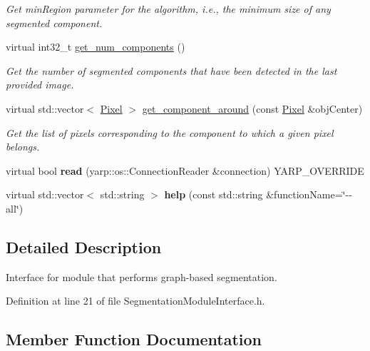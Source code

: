\begin{DoxyCompactItemize}
\begin{DoxyCompactList}\small\item\em Get min\+Region parameter for the algorithm, i.\+e., the minimum size of any segmented component. \end{DoxyCompactList}\item 
virtual int32\+\_\+t \hyperlink{classyarp_1_1sig_1_1SegmentationModuleInterface_a3c6b695fbef9e6827e7dd6b4cbbc38fe}{get\+\_\+num\+\_\+components} ()
\begin{DoxyCompactList}\small\item\em Get the number of segmented components that have been detected in the last provided image. \end{DoxyCompactList}\item 
virtual std\+::vector$<$ \hyperlink{classyarp_1_1sig_1_1Pixel}{Pixel} $>$ \hyperlink{classyarp_1_1sig_1_1SegmentationModuleInterface_a9bf0b95fbab216b2284122b0b8a36820}{get\+\_\+component\+\_\+around} (const \hyperlink{classyarp_1_1sig_1_1Pixel}{Pixel} \&obj\+Center)
\begin{DoxyCompactList}\small\item\em Get the list of pixels corresponding to the component to which a given pixel belongs. \end{DoxyCompactList}\item 
\mbox{\label{classyarp_1_1sig_1_1SegmentationModuleInterface_a8ed15458e768ad8dcc58b622a6f1d282}} 
virtual bool {\bfseries read} (yarp\+::os\+::\+Connection\+Reader \&connection) Y\+A\+R\+P\+\_\+\+O\+V\+E\+R\+R\+I\+DE
\item 
\mbox{\label{classyarp_1_1sig_1_1SegmentationModuleInterface_a14ea1dff9efc91a5099633740b3e45f9}} 
virtual std\+::vector$<$ std\+::string $>$ {\bfseries help} (const std\+::string \&function\+Name=\char`\"{}-\/-\/all\char`\"{})
\end{DoxyCompactItemize}


\subsection{Detailed Description}
Interface for module that performs graph-\/based segmentation. 

Definition at line 21 of file Segmentation\+Module\+Interface.\+h.



\subsection{Member Function Documentation}
\mbox{\label{classyarp_1_1sig_1_1SegmentationModuleInterface_a9bf0b95fbab216b2284122b0b8a36820}} 
